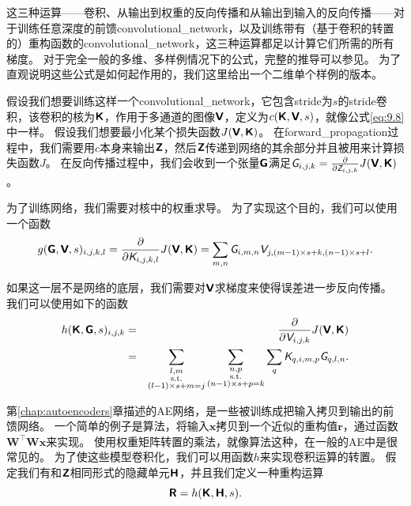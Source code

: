 这三种运算——卷积、从输出到权重的反向传播和从输出到输入的反向传播——对于训练任意深度的前馈\gls{convolutional_network}，以及训练带有（基于卷积的转置的）重构函数的\gls{convolutional_network}，这三种运算都足以计算它们所需的所有梯度。
对于完全一般的多维、多样例情况下的公式，完整的推导可以参见\cite{Goodfellow-TR2010}。 
为了直观说明这些公式是如何起作用的，我们这里给出一个二维单个样例的版本。
 
 
假设我们想要训练这样一个\gls{convolutional_network}，它包含\gls{stride}为$s$的\gls{stride}卷积，该卷积的核为$\textsf{\textbf{K}}$，作用于多通道的图像$\textsf{\textbf{V}}$，定义为$c(\textsf{\textbf{K}}, \textsf{\textbf{V}}, s)$，就像公式\ref{eq:9.8}中一样。
假设我们想要最小化某个损失函数$J(\textsf{\textbf{V}}, \textsf{\textbf{K}})$。
在\gls{forward_propagation}过程中，我们需要用$c$本身来输出$\textsf{\textbf{Z}}$，然后$\textsf{\textbf{Z}}$传递到网络的其余部分并且被用来计算损失函数$J$。
在反向传播过程中，我们会收到一个张量$\textsf{\textbf{G}}$满足$\textit{\textsf{G}}_{i, j, k} = \frac{\partial}{\partial \textit{\textsf{Z}}_{i, j, k}} J(\textsf{\textbf{V}}, \textsf{\textbf{K}})$。

为了训练网络，我们需要对核中的权重求导。
为了实现这个目的，我们可以使用一个函数
\begin{equation}
g(\textsf{\textbf{G}}, \textsf{\textbf{V}}, s)_{i, j, k, l} = \frac{\partial}{\partial \textit{\textsf{K}}_{i, j, k, l}} J(\textsf{\textbf{V}}, \textsf{\textbf{K}}) = \sum_{m, n} \textit{\textsf{G}}_{i, m, n} \textit{\textsf{V}}_{j, (m-1)\times s+k, (n-1)\times s+l}.
\end{equation}

如果这一层不是网络的底层，我们需要对$\textsf{\textbf{V}}$求梯度来使得误差进一步反向传播。
我们可以使用如下的函数
\begin{eqnarray}
h(\textsf{\textbf{K}}, \textsf{\textbf{G}}, s)_{i, j, k} &=& \frac{\partial }{\partial \textit{\textsf{V}}_{i, j, k}} J(\textsf{\textbf{V}}, \textsf{\textbf{K}})\\
&=& \sum_{\substack{l, m\\
                  \text{s.t.}\\
                  (l-1)\times s+m = j}} \sum_{\substack{n, p\\
                                                            \text{s.t.}\\
                                                            (n-1)\times s +p = k}}
            \sum_q \textit{\textsf{K}}_{q,i,m,p} \textit{\textsf{G}}_{q, l, n}.
\end{eqnarray}

第\ref{chap:autoencoders}章描述的\gls{AE}网络，是一些被训练成把输入拷贝到输出的前馈网络。
一个简单的例子是算法，将输入$\bm{x}$拷贝到一个近似的重构值$\bm{r}$，通过函数$\bm{W}^\top \bm{Wx}$来实现。
使用权重矩阵转置的乘法，就像算法这种，在一般的\gls{AE}中是很常见的。
为了使这些模型卷积化，我们可以用函数$h$来实现卷积运算的转置。
假定我们有和$\textsf{\textbf{Z}}$相同形式的隐藏单元$\textsf{\textbf{H}}$，并且我们定义一种重构运算
\begin{equation}
\textsf{\textbf{R}} = h(\textsf{\textbf{K}}, \textsf{\textbf{H}}, s).
\end{equation}

